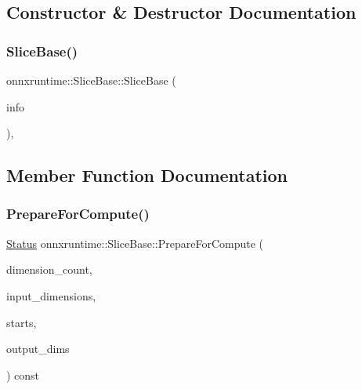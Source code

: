 \subsection{Constructor \& Destructor Documentation}
\mbox{\label{classonnxruntime_1_1SliceBase_a11f5d17d420505aa93f1aed03aefa603}} 
\subsubsection{\texorpdfstring{Slice\+Base()}{SliceBase()}}
{\footnotesize\ttfamily onnxruntime\+::\+Slice\+Base\+::\+Slice\+Base (\begin{DoxyParamCaption}\item[{const \mbox{\hyperlink{classonnxruntime_1_1OpKernelInfo}{Op\+Kernel\+Info}} \&}]{info }\end{DoxyParamCaption})\hspace{0.3cm}{\ttfamily [inline]}, {\ttfamily [protected]}}



\subsection{Member Function Documentation}
\mbox{\label{classonnxruntime_1_1SliceBase_af5027d33a64a37d4ff7eb2c599083e63}} 
\subsubsection{\texorpdfstring{Prepare\+For\+Compute()}{PrepareForCompute()}}
{\footnotesize\ttfamily \mbox{\hyperlink{classonnxruntime_1_1common_1_1Status}{Status}} onnxruntime\+::\+Slice\+Base\+::\+Prepare\+For\+Compute (\begin{DoxyParamCaption}\item[{const \mbox{\hyperlink{mlasi_8h_a503efbc1c6e50825320ad909366b78ab}{size\+\_\+t}}}]{dimension\+\_\+count,  }\item[{const std\+::vector$<$ int64\+\_\+t $>$ \&}]{input\+\_\+dimensions,  }\item[{std\+::vector$<$ int64\+\_\+t $>$ \&}]{starts,  }\item[{std\+::vector$<$ int64\+\_\+t $>$ \&}]{output\+\_\+dims }\end{DoxyParamCaption}) const\hspace{0.3cm}{\ttfamily [protected]}}



